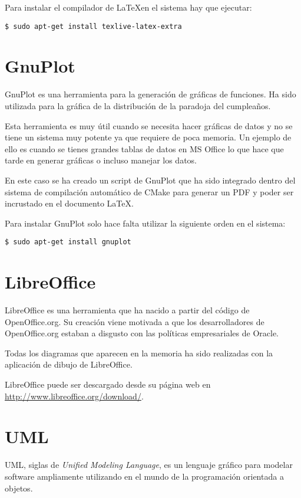 Para instalar el compilador de \LaTeX en el sistema hay que ejecutar:

\begin{verbatim}
$ sudo apt-get install texlive-latex-extra
\end{verbatim}

\section{GnuPlot}

GnuPlot es una herramienta para la generación de gráficas de funciones. Ha sido utilizada para la gráfica de la distribución de la paradoja del cumpleaños.

Esta herramienta es muy útil cuando se necesita hacer gráficas de datos y no se tiene un sistema muy potente ya que requiere de poca memoria. Un ejemplo de ello es cuando se tienes grandes tablas de datos en MS Office lo que hace que tarde en generar gráficas o incluso manejar los datos.

En este caso se ha creado un script de GnuPlot que ha sido integrado dentro del sistema de compilación automático de CMake para generar un PDF y poder ser incrustado en el documento \LaTeX.

Para instalar GnuPlot solo hace falta utilizar la siguiente orden en el sistema:

\begin{verbatim}
$ sudo apt-get install gnuplot
\end{verbatim}

\section{LibreOffice}

LibreOffice es una herramienta que ha nacido a partir del código de OpenOffice.org. Su creación viene motivada a que los desarrolladores de OpenOffice.org estaban a disgusto con las políticas empresariales de Oracle.

Todas los diagramas que aparecen en la memoria ha sido realizadas con la aplicación de dibujo de LibreOffice.

LibreOffice puede ser descargado desde su página web en \url{http://www.libreoffice.org/download/}.

\section{UML}

UML, siglas de \emph{Unified Modeling Language}, es un lenguaje gráfico para modelar software ampliamente utilizando en el mundo de la programación orientada a objetos.

